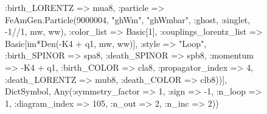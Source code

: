 \documentclass{revtex4}
\begin{document}
\begin{figure}[!htb]
\begin{center}
{:birth_LORENTZ => mua8, :particle => FeAmGen.Particle(9000004, "ghWm", "ghWmbar", :ghost, :singlet, -1//1, mw, ww), :color_list => Basic[1], :couplings_lorentz_list => Basic[im*Den(-K4 + q1, mw, ww)], :style => "Loop", :birth_SPINOR => spa8, :death_SPINOR => spb8, :momentum => -K4 + q1, :birth_COLOR => cla8, :propagator_index => 4, :death_LORENTZ => mub8, :death_COLOR => clb8))], Dict{Symbol, Any}(:symmetry_factor => 1, :sign => -1, :n_loop => 1, :diagram_index => 105, :n_out => 2, :n_inc => 2)) 
}
\end{center}
\end{figure}
\end{document}
